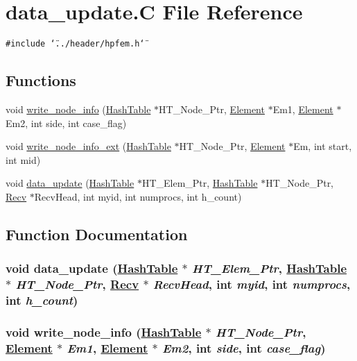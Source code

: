 \hypertarget{data__update_8C}{
\section{data\_\-update.C File Reference}
\label{data__update_8C}
}
{\tt \#include \char`\"{}../header/hpfem.h\char`\"{}}\par
\subsection*{Functions}
\begin{CompactItemize}
\item 
void \hyperlink{data__update_8C_a0}{write\_\-node\_\-info} (\hyperlink{classHashTable}{Hash\-Table} $\ast$HT\_\-Node\_\-Ptr, \hyperlink{classElement}{Element} $\ast$Em1, \hyperlink{classElement}{Element} $\ast$Em2, int side, int case\_\-flag)
\item 
void \hyperlink{data__update_8C_a1}{write\_\-node\_\-info\_\-ext} (\hyperlink{classHashTable}{Hash\-Table} $\ast$HT\_\-Node\_\-Ptr, \hyperlink{classElement}{Element} $\ast$Em, int start, int mid)
\item 
void \hyperlink{data__update_8C_a2}{data\_\-update} (\hyperlink{classHashTable}{Hash\-Table} $\ast$HT\_\-Elem\_\-Ptr, \hyperlink{classHashTable}{Hash\-Table} $\ast$HT\_\-Node\_\-Ptr, \hyperlink{classRecv}{Recv} $\ast$Recv\-Head, int myid, int numprocs, int h\_\-count)
\end{CompactItemize}


\subsection{Function Documentation}
\hypertarget{data__update_8C_a2}{
\subsubsection[data\_\-update]{\setlength{\rightskip}{0pt plus 5cm}void data\_\-update (\hyperlink{classHashTable}{Hash\-Table} $\ast$ {\em HT\_\-Elem\_\-Ptr}, \hyperlink{classHashTable}{Hash\-Table} $\ast$ {\em HT\_\-Node\_\-Ptr}, \hyperlink{classRecv}{Recv} $\ast$ {\em Recv\-Head}, int {\em myid}, int {\em numprocs}, int {\em h\_\-count})}}
\label{data__update_8C_a2}


\hypertarget{data__update_8C_a0}{
\subsubsection[write\_\-node\_\-info]{\setlength{\rightskip}{0pt plus 5cm}void write\_\-node\_\-info (\hyperlink{classHashTable}{Hash\-Table} $\ast$ {\em HT\_\-Node\_\-Ptr}, \hyperlink{classElement}{Element} $\ast$ {\em Em1}, \hyperlink{classElement}{Element} $\ast$ {\em Em2}, int {\em side}, int {\em case\_\-flag})}}
\label{data__update_8C_a0}


